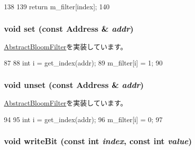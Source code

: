 \begin{DoxyCode}
138 {
139     return m_filter[index];
140 }
\end{DoxyCode}
\hypertarget{classBlockBloomFilter_a2b666fae2a5c2b98bc5cba8e1333bcc9}{
\subsubsection[{set}]{\setlength{\rightskip}{0pt plus 5cm}void set (const {\bf Address} \& {\em addr})}}
\label{classBlockBloomFilter_a2b666fae2a5c2b98bc5cba8e1333bcc9}


\hyperlink{classAbstractBloomFilter_a54e1262ae5f60efeb8714d0556b3c32e}{AbstractBloomFilter}を実装しています。


\begin{DoxyCode}
87 {
88     int i = get_index(addr);
89     m_filter[i] = 1;
90 }
\end{DoxyCode}
\hypertarget{classBlockBloomFilter_a69b772787ea61467af679e3aa5406b41}{
\subsubsection[{unset}]{\setlength{\rightskip}{0pt plus 5cm}void unset (const {\bf Address} \& {\em addr})}}
\label{classBlockBloomFilter_a69b772787ea61467af679e3aa5406b41}


\hyperlink{classAbstractBloomFilter_a0a35d1c7bad19fe9362068a0d319ec5f}{AbstractBloomFilter}を実装しています。


\begin{DoxyCode}
94 {
95     int i = get_index(addr);
96     m_filter[i] = 0;
97 }
\end{DoxyCode}
\hypertarget{classBlockBloomFilter_ac188318778d26b44f567c5b530598c16}{
\subsubsection[{writeBit}]{\setlength{\rightskip}{0pt plus 5cm}void writeBit (const int {\em index}, \/  const int {\em value})}}
\label{classBlockBloomFilter_ac188318778d26b44f567c5b530598c16}



